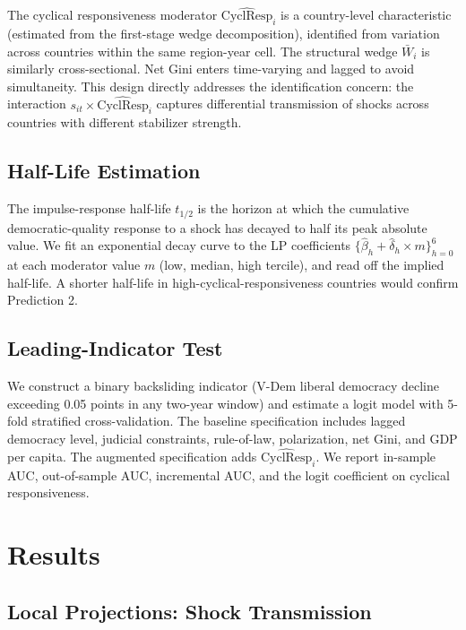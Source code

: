 \documentclass[11pt,letterpaper]{article}
\begin{document}
The cyclical responsiveness moderator $\widehat{\text{CyclResp}}_i$ is a country-level characteristic (estimated from the first-stage wedge decomposition), identified from variation across countries within the same region-year cell. The structural wedge $\bar{W}_i$ is similarly cross-sectional. Net Gini enters time-varying and lagged to avoid simultaneity. This design directly addresses the identification concern: the interaction $s_{it} \times \widehat{\text{CyclResp}}_i$ captures differential transmission of shocks across countries with different stabilizer strength.

\subsection{Half-Life Estimation}

The impulse-response half-life $t_{1/2}$ is the horizon at which the cumulative democratic-quality response to a shock has decayed to half its peak absolute value. We fit an exponential decay curve to the LP coefficients $\{\hat{\beta}_h + \hat{\delta}_h \times m\}_{h=0}^6$ at each moderator value $m$ (low, median, high tercile), and read off the implied half-life. A shorter half-life in high-cyclical-responsiveness countries would confirm Prediction 2.

\subsection{Leading-Indicator Test}

We construct a binary backsliding indicator (V-Dem liberal democracy decline exceeding 0.05 points in any two-year window) and estimate a logit model with 5-fold stratified cross-validation. The baseline specification includes lagged democracy level, judicial constraints, rule-of-law, polarization, net Gini, and GDP per capita. The augmented specification adds $\widehat{\text{CyclResp}}_i$. We report in-sample AUC, out-of-sample AUC, incremental AUC, and the logit coefficient on cyclical responsiveness.

\section{Results}
\label{sec:results}

\subsection{Local Projections: Shock Transmission}
\end{document}
